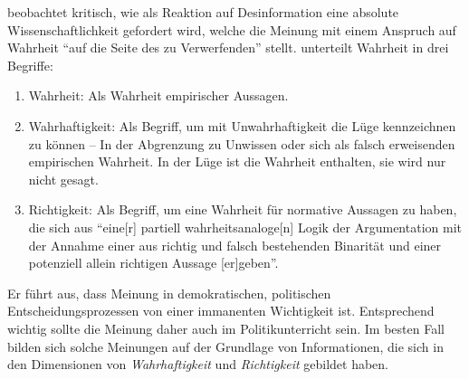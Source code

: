 \noindent \textcite{Nullmeier2019} beobachtet kritisch, wie als Reaktion auf Desinformation eine absolute Wissenschaftlichkeit gefordert wird, welche die Meinung mit einem Anspruch auf Wahrheit \enquote{auf die Seite des zu Verwerfenden} \autocite{Nullmeier2019} stellt.  \citeauthor{Nullmeier2019} unterteilt Wahrheit in drei Begriffe:
\begin{enumerate}
    \item Wahrheit: Als Wahrheit empirischer Aussagen.
    \item Wahrhaftigkeit: Als Begriff, um mit Unwahrhaftigkeit die Lüge kennzeichnen zu können -- In der Abgrenzung zu Unwissen oder sich als falsch erweisenden empirischen Wahrheit. In der Lüge ist die Wahrheit enthalten, sie wird nur nicht gesagt. 
    \item Richtigkeit: Als Begriff, um eine Wahrheit für normative Aussagen zu haben, die sich aus \enquote{eine[r] partiell wahrheitsanaloge[n] Logik der Argumentation mit der Annahme einer aus richtig und falsch bestehenden Binarität und einer potenziell allein richtigen Aussage [er]geben}. 
    
    \noindent \autocite{Nullmeier2019}
\end{enumerate} 
Er führt aus, dass Meinung in demokratischen, politischen Entscheidungsprozessen von einer immanenten Wichtigkeit ist. Entsprechend wichtig sollte die Meinung daher auch im Politikunterricht sein.
Im besten Fall bilden sich solche Meinungen auf der Grundlage von Informationen, die sich in den Dimensionen von \emph{Wahrhaftigkeit} und \emph{Richtigkeit} gebildet haben. %


 


